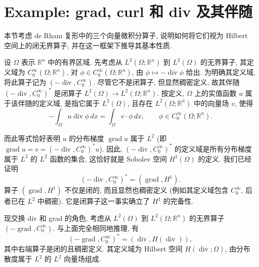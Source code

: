 \section{{Example: grad, curl 和 div 及其伴随}}\label{sec:vector-operators-adjoints}

{本节考虑 de Rham 复形中的三个向量微积分算子, 说明如何将它们视为 Hilbert 空间上的闭无界算子, 并在这一框架下推导其基本性质.}

{设 $\Omega$ 表示 $\mathbb R^n$ 中的有界区域. 先考虑从 $L^2(\Omega;\mathbb R^n)$ 到 $L^2(\Omega)$ 的无界算子, 其定义域为 $C_0^\infty(\Omega;\mathbb R^n)$, 对 $\phi\in C_0^\infty(\Omega;\mathbb R^n)$, 由 $\phi\mapsto-\operatorname{div}\phi$ 给出. 为明确其定义域, 将此算子记为 $(-\operatorname{div},C_0^\infty)$. 尽管它不是闭算子, 但显然稠密定义, 故其伴随 $(-\operatorname{div},C_0^\infty)^*$ 是闭算子 $L^2(\Omega)\to L^2(\Omega;\mathbb R^n)$. 按定义, $\Omega$ 上的实值函数 $u$ 属于该伴随的定义域, 是指它属于 $L^2(\Omega)$, 且存在 $L^2(\Omega;\mathbb R^n)$ 中的向量场 $v$, 使得}
\[
-\int_\Omega u\operatorname{div}\phi\,dx=\int_\Omega v\cdot\phi\,dx,\qquad\phi\in C_0^\infty(\Omega;\mathbb R^n).
\]

{而此等式恰好表明 $u$ 的分布梯度 $\operatorname{grad}u$ 属于 $L^2$ (即 $\operatorname{grad}u=v=(-\operatorname{div},C_0^\infty)^*u$). 因此, $(-\operatorname{div},C_0^\infty)^*$ 的定义域是所有分布梯度属于 $L^2$ 的 $L^2$ 函数的集合, 这恰好就是 Sobolev 空间 $H^1(\Omega)$ 的定义. 我们已经证明}
\[
(-\operatorname{div},C_0^\infty)^*=(\operatorname{grad},H^1).
\]
{算子 $(\operatorname{grad},H^1)$ 不仅是闭的, 而且显然也稠密定义 (例如其定义域包含 $C_0^\infty$, 后者已在 $L^2$ 中稠密). 它是闭算子这一事实确立了 $H^1$ 的完备性.}

{现交换 div 和 grad 的角色, 考虑从 $L^2(\Omega)$ 到 $L^2(\Omega;\mathbb R^n)$ 的无界算子 $(-\operatorname{grad},C_0^\infty)$. 与上面完全相同地推理, 有}
\[
(-\operatorname{grad},C_0^\infty)^*=(\operatorname{div},H(\operatorname{div})),
\]
{其中右端算子是闭的且稠密定义. 其定义域为 Hilbert 空间 $H(\operatorname{div};\Omega)$, 由分布散度属于 $L^2$ 的 $L^2$ 向量场组成.}

